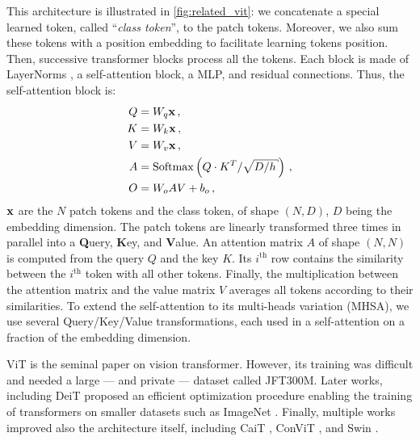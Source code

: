 This architecture is illustrated in \autoref{fig:related_vit}: we concatenate a special learned
token, called ``\textit{class token}'', to the patch tokens. Moreover, we also sum these tokens with
a position embedding to facilitate learning tokens position. Then, successive
transformer blocks process all the tokens. Each block is made of LayerNorms \citep{ba2016layernorm},
a self-attention block, a \ac{MLP}, and residual connections. Thus, the self-attention block is:
%
\begin{equation}
      \begin{aligned}
            Q & =W_{q} \vx\,,                                                       \\
            K & =W_{k} \vx\,,                                                       \\
            V & =W_{v} \vx\,,                                                       \\
            A & =\operatorname{Softmax}\left(Q \cdot K^{T} / \sqrt{D / h}\right)\,, \\
            O & = W_{o} A V+b_{o}\,,
      \end{aligned}
      \label{sec:related_sa}
\end{equation}
%
\noindent $\mathbf{x}$ are the $N$ patch tokens and the class token, of shape $(N, D)$, $D$ being the
embedding dimension. The patch tokens are linearly transformed three times in parallel into a
\textbf{Q}uery, \textbf{K}ey, and \textbf{V}alue. An attention matrix $A$ of shape $(N, N)$ is
computed from the query $Q$ and the key $K$. Its $i^{\text{th}}$ row contains the similarity between
the $i^{\text{th}}$ token with all other tokens. Finally, the multiplication between the attention
matrix and the value matrix $V$ averages all tokens according to their similarities. To extend the
self-attention to its multi-heads variation (\ac{MHSA}), we use several Query/Key/Value
transformations, each used in a self-attention on a fraction of the embedding dimension.

ViT \citep{dosovitskiy2020vit} is the seminal paper on vision transformer. However, its training was
difficult and needed a large --- and private --- dataset called JFT300M. Later works, including DeiT
\citep{touvron2021deit} proposed an efficient optimization procedure enabling the training of
transformers on smaller datasets such as ImageNet \citep{russakovsky2015imagenet_ilsvrc}. Finally,
multiple works improved also the architecture itself, including CaiT \citep{touvron2021cait}, ConViT
\citep{dascoli2021convit}, and Swin \citep{liu2021swin}.

